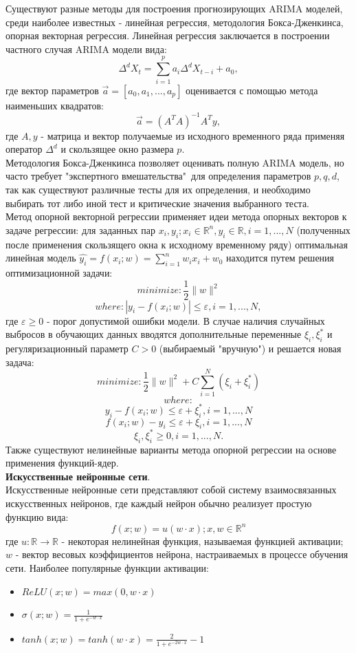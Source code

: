 \documentclass[11pt]{article}
\newcommand\norm[1]{\lVert#1\rVert}
\begin{document}
Существуют разные методы для построения прогнозирующих ARIMA моделей, среди наиболее известных - линейная регрессия, методология Бокса-Дженкинса, опорная векторная регрессия. Линейная регрессия заключается в построении частного случая ARIMA модели вида:
$$\Delta^dX_t = \sum_{i=1}^{p}{a_i\Delta^dX_{t-i}} + a_0 ,$$
где вектор параметров $\vec{a} = [a_0, a_1, ..., a_p]$ оценивается с помощью метода наименьших квадратов:
$$ \vec{a} = {(A^TA)}^{-1}A^Ty ,$$
где $A, y$ - матрица и вектор получаемые из исходного временного ряда применяя оператор $\Delta^d$ и скользящее окно размера $p$.
\\
Методология Бокса-Дженкинса позволяет оценивать полную ARIMA модель, но часто требует "экспертного вмешательства"\ для определения параметров $p,q,d$, так как существуют различные тесты для их определения, и необходимо выбирать тот либо иной тест и критические значения выбранного теста.
\\
Метод опорной векторной регрессии применяет идеи метода опорных векторов к задаче регрессии: для заданных пар $x_i, y_i; x_i \in \mathbb{R}^n, y_i \in \mathbb{R}, i=1,...,N$ (полученных после применения скользящего окна к исходному временному ряду) оптимальная линейная модель $\hat{y_i} = f(x_i;w) = \sum_{i=1}^{n}{w_ix_i} + w_0$ находится путем решения оптимизационной задачи:
$$ minimize: \frac{1}{2}\norm{w}^2 $$
$$ where: |y_i - f(x_i;w)| \le \varepsilon, i=1,...,N, $$
где $ \varepsilon \ge 0 $ - порог допустимой ошибки модели. В случае наличия случайных выбросов в обучающих данных вводятся дополнительные переменные $ \xi_i, \xi^*_i $ и регуляризационный параметр $ C > 0 $ (выбираемый "вручную") и решается новая задача:
$$ minimize: \frac{1}{2}\norm{w}^2 + C\sum_{i=1}^{N}{(\xi_i + \xi^*_i)} $$
$$ where: $$
$$ y_i - f(x_i; w) \le \varepsilon + \xi^*_i, i=1,...,N $$
$$ f(x_i; w) - y_i \le \varepsilon + \xi_i, i=1,...,N $$
$$ \xi_i, \xi^*_i \ge 0, i=1,...,N. $$
Также существуют нелинейные варианты метода опорной регрессии на основе применения функций-ядер. 
\\
\textbf{Искусственные нейронные сети}.
\\
Искусственные нейронные сети представляют собой систему взаимосвязанных искусственных нейронов, где каждый нейрон обычно реализует простую функцию вида:
$$ f(x;w) = u(w \cdot x); x,w \in \mathbb{R}^n $$
где $u: \mathbb{R} \to \mathbb{R} $ - некоторая нелинейная функция, называемая функцией активации; $ w $ - вектор весовых коэффициентов нейрона, настраиваемых в процессе обучения сети. Наиболее популярные функции активации:
\begin{itemize}
\item $ReLU(x;w) = max(0,w \cdot x)$
\item $ \sigma(x;w) = \frac{1}{1 + e^{-w \cdot x}} $
\item $ tanh(x;w) = tanh(w \cdot x) = \frac{2}{1 + e^{-2 w \cdot x}} - 1$
\end{itemize}
\end{document}
